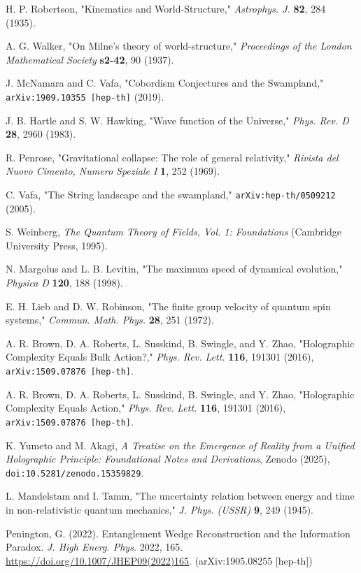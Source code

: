 \documentclass[11pt, letterpaper]{report}
\theoremstyle{plain} %
\theoremstyle{definition} %
\theoremstyle{remark} %
\begin{document}
\begin{thebibliography}{99}
H. P. Robertson, "Kinematics and World-Structure," \textit{Astrophys. J.} \textbf{82}, 284 (1935).

A. G. Walker, "On Milne’s theory of world-structure," \textit{Proceedings of the London Mathematical Society} \textbf{s2-42}, 90 (1937).

J. McNamara and C. Vafa, "Cobordism Conjectures and the Swampland," \texttt{arXiv:1909.10355 [hep-th]} (2019).

J. B. Hartle and S. W. Hawking, "Wave function of the Universe," \textit{Phys. Rev. D} \textbf{28}, 2960 (1983).

R. Penrose, "Gravitational collapse: The role of general relativity," \textit{Rivista del Nuovo Cimento, Numero Speziale I} \textbf{1}, 252 (1969).

C. Vafa, "The String landscape and the swampland," \texttt{arXiv:hep-th/0509212} (2005).

S. Weinberg, \textit{The Quantum Theory of Fields, Vol. 1: Foundations} (Cambridge University Press, 1995).

\label{MargolusLevitin1998}
N. Margolus and L. B. Levitin, "The maximum speed of dynamical evolution," \textit{Physica D} \textbf{120}, 188 (1998).

\label{LiebRobinson1972}
E. H. Lieb and D. W. Robinson, "The finite group velocity of quantum spin systems," \textit{Commun. Math. Phys.} \textbf{28}, 251 (1972).

\label{BrownEtAl2016Action}
A. R. Brown, D. A. Roberts, L. Susskind, B. Swingle, and Y. Zhao, "Holographic Complexity Equals Bulk Action?," \textit{Phys. Rev. Lett.} \textbf{116}, 191301 (2016), \texttt{arXiv:1509.07876 [hep-th]}.

A. R. Brown, D. A. Roberts, L. Susskind, B. Swingle, and Y. Zhao, "Holographic Complexity Equals Action," \textit{Phys. Rev. Lett.} \textbf{116}, 191301 (2016), \texttt{arXiv:1509.07876 [hep-th]}.

\label{Yumeto_Akagi_2025}
K. Yumeto and M. Akagi, \textit{A Treatise on the Emergence of Reality from a Unified Holographic Principle: Foundational Notes and Derivations}, Zenodo (2025), \texttt{doi:10.5281/zenodo.15359829}.

\label{MandelstamTamm1945}
L. Mandelstam and I. Tamm, "The uncertainty relation between energy and time in non-relativistic quantum mechanics," \textit{J. Phys. (USSR)} \textbf{9}, 249 (1945).

\label{Penington2019EntanglementWedge}
Penington, G. (2022). Entanglement Wedge Reconstruction and the Information Paradox. \textit{J. High Energ. Phys.} 2022, 165. \href{https://doi.org/10.1007/JHEP09(2022)165}{https://doi.org/10.1007/JHEP09(2022)165}. (arXiv:1905.08255 [hep-th])

\end{thebibliography}
\end{document}
